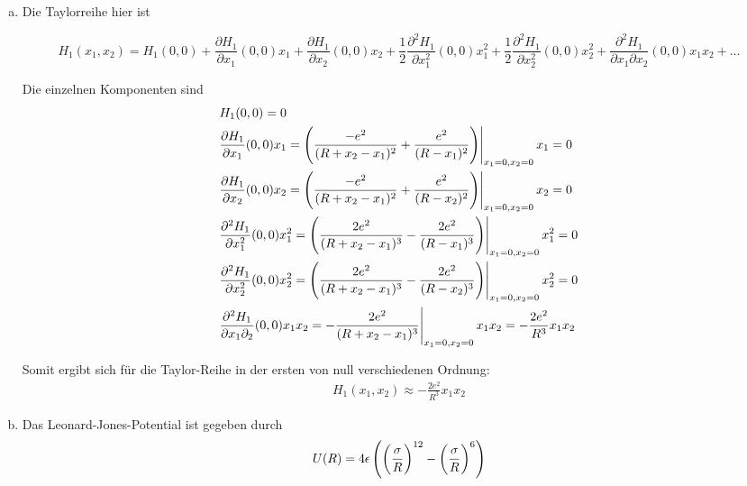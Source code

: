 \documentclass[a4paper,german,12pt,smallheadings]{scrartcl}
\begin{document}
\begin{enumerate}[a)]
  \item
    Die Taylorreihe hier ist

    \begin{equation}
      H_1(x_1, x_2) = H_1(0,0)
        +             \frac{\partial H_1}{\partial x_1}                (0,0) x_1
        +             \frac{\partial H_1}{\partial x_2}                (0,0) x_2
        + \frac{1}{2} \frac{\partial^2 H_1}{\partial x_1^2}            (0,0) x_1^2
        + \frac{1}{2} \frac{\partial^2 H_1}{\partial x_2^2}            (0,0) x_2^2
        + \frac{\partial^2 H_1}{\partial x_1 \partial x_2} (0,0) x_1x_2
        + \dots
    \end{equation}

    Die einzelnen Komponenten sind
    \begin{align}
      &H_1(0,0) = 0 \\
      &\frac{\partial H_1}{\partial x_1}(0,0) x_1
        = \eval{\del{\frac{-e^2}{(R+x_2-x_1)^2} + \frac{e^2}{(R-x_1)^2}}}_{x_1=0, x_2=0} x_1 = 0 \\
      &\frac{\partial H_1}{\partial x_2}(0,0) x_2
        = \eval{\del{\frac{-e^2}{(R+x_2-x_1)^2} + \frac{e^2}{(R-x_2)^2}}}_{x_1=0, x_2=0} x_2 = 0 \\
      &\frac{\partial^2 H_1}{\partial x_1^2}(0,0) x_1^2
        = \eval{\del{\frac{2e^2}{(R+x_2-x_1)^3} - \frac{2e^2}{(R-x_1)^3}}}_{x_1=0, x_2=0} x_1^2 = 0 \\
      &\frac{\partial^2 H_1}{\partial x_2^2}(0,0) x_2^2
        = \eval{\del{\frac{2e^2}{(R+x_2-x_1)^3} - \frac{2e^2}{(R-x_2)^3}}}_{x_1=0, x_2=0} x_2^2 = 0 \\
      &\frac{\partial^2 H_1}{\partial x_1 \partial_2}(0,0) x_1x_2
        = \eval{-\frac{2e^2}{(R+x_2-x_1)^3}}_{x_1=0, x_2=0} x_1x_2 = -\frac{2e^2}{R^3} x_1 x_2 \\
    \end{align}

    Somit ergibt sich für die Taylor-Reihe in der ersten von null verschiedenen Ordnung:
    \begin{align}
      H_1(x_1, x_2) \approx  -\frac{2e^2}{R^3} x_1 x_2
    \end{align}
  \item
    Das Leonard-Jones-Potential ist gegeben durch
    \begin{equation}
      U(R) = 4 \epsilon \del{\del{\frac{\sigma}{R}}^{12} - \del{\frac{\sigma}{R}}^6}
    \end{equation}


\end{enumerate}
\end{document}
